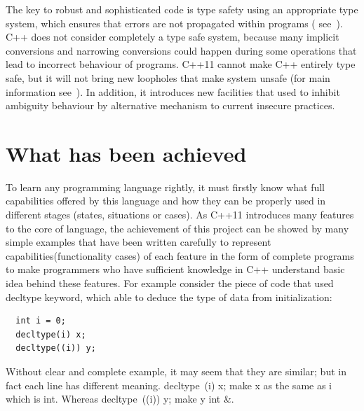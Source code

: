 \documentclass[11pt]{report}
\begin{document}
The key to robust and sophisticated code is type safety using an appropriate type system, which ensures that errors are not propagated within programs ( see~\cite{Stroustrup:2005:Cpp}). C++ does not consider completely a type safe system, because many implicit conversions and narrowing conversions could happen during some operations that lead to incorrect behaviour of programs. C++11 cannot make C++ entirely type safe, but it will not bring new loopholes that make system unsafe (for main information see~\cite{Stroustrup:2005:Cpp}). In addition, it introduces new facilities that used to inhibit ambiguity behaviour by alternative mechanism to current insecure practices.


\section{What has been achieved}
\label{what has been achieved}
To learn any programming language rightly, it must firstly know what full capabilities offered by this language and how they can be properly used in different stages (states, situations or cases). As C++11 introduces many features to the core of language, the achievement of this project can be showed by many simple examples that have been written carefully to represent capabilities(functionality cases) of each feature in the form of complete programs to make programmers who have sufficient knowledge in C++ understand basic idea behind these features. For example consider the piece of code that used decltype keyword, which able to deduce the type of data from initialization:
\begin{lstlisting}
  int i = 0;
  decltype(i) x;
  decltype((i)) y;
\end{lstlisting}
Without clear and complete example, it may seem that they are similar; but in fact each line has different meaning. decltype~(i) x; make x as the same as i which is int. Whereas decltype~((i)) y; make y int \&.

\end{document}
